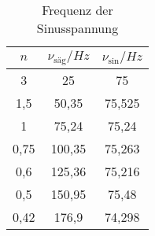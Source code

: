 

%




\begin{table}[h!]
  \centering
  \caption{Frequenz der Sinusspannung}
  \label{tab:Frequenz}
  \begin{tabular}{c c c}
    \toprule
    $n$ & $\nu_{\text{säg}}/Hz$ & $\nu_{\text{sin}}/Hz$\\

    \midrule
    3     &25     & 75\\
    1,5   &50,35  & 75,525\\
    1     &75,24  & 75,24\\
    0,75  &100,35 & 75,263\\
    0,6   &125,36 & 75,216\\
    0,5   &150,95 & 75,48\\
    0,42   &176,9  & 74,298\\
    \bottomrule
  \end{tabular}
\end{table}

%
